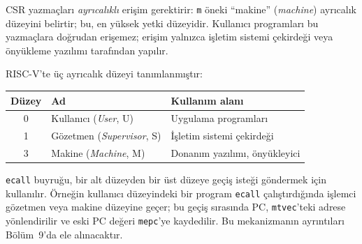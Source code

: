 CSR yazmaçları \emph{ayrıcalıklı} erişim gerektirir: \texttt{m} öneki ``makine'' (\emph{machine}) ayrıcalık düzeyini belirtir; bu, en yüksek yetki düzeyidir. Kullanıcı programları bu yazmaçlara doğrudan erişemez; erişim yalnızca işletim sistemi çekirdeği veya önyükleme yazılımı tarafından yapılır.

RISC-V'te üç ayrıcalık düzeyi tanımlanmıştır:

\begin{center}
\small
\begin{tabular}{cll}
\toprule
Düzey & Ad & Kullanım alanı \\
\midrule
0 & Kullanıcı (\emph{User}, U) & Uygulama programları \\
1 & Gözetmen (\emph{Supervisor}, S) & İşletim sistemi çekirdeği \\
3 & Makine (\emph{Machine}, M) & Donanım yazılımı, önyükleyici \\
\bottomrule
\end{tabular}
\end{center}

\texttt{ecall} buyruğu, bir alt düzeyden bir üst düzeye geçiş isteği göndermek için kullanılır. Örneğin kullanıcı düzeyindeki bir program \texttt{ecall} çalıştırdığında işlemci gözetmen veya makine düzeyine geçer; bu geçiş sırasında PC, \texttt{mtvec}'teki adrese yönlendirilir ve eski PC değeri \texttt{mepc}'ye kaydedilir. Bu mekanizmanın ayrıntıları Bölüm~9'da ele alınacaktır.

